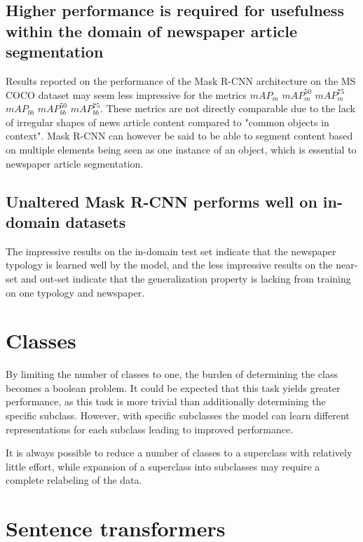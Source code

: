 \documentclass[oneside, english, bibtex]{kththesis}
\begin{document}
\subsection{Higher performance is required for usefulness within the domain of newspaper article segmentation}

Results reported on the performance of the Mask R-CNN architecture on the MS COCO dataset may seem less impressive for the metrics  \textbf{$mAP_m$} \textbf{$mAP_m^{50}$} \textbf{$mAP_m^{75}$} \textbf{$mAP_{bb}$} \textbf{$mAP_{bb}^{50}$} \textbf{$mAP_{bb}^{75}$}. These metrics are not directly comparable due to the lack of irregular shapes of news article content compared to "common objects in context". Mask R-CNN can however be said to be able to segment content based on multiple elements being seen as one instance of an object, which is essential to newspaper article segmentation.

\subsection{Unaltered Mask R-CNN performs well on in-domain datasets} 

The impressive results on the in-domain test set indicate that the newspaper typology is learned well by the model, and the less impressive results on the near-set and out-set indicate that the generalization property is lacking from training on one typology and newspaper. 

\section{Classes}
By limiting the number of classes to one, the burden of determining the class becomes a boolean problem. It could be expected that this task yields greater performance, as this task is more trivial than additionally determining the specific subclass. However, with specific subclasses the model can learn different representations for each subclass leading to improved performance. 

It is always possible to reduce a number of classes to a superclass with relatively little effort, while expansion of a superclass into subclasses may require a complete relabeling of the data.

\section{Sentence transformers}
\end{document}
